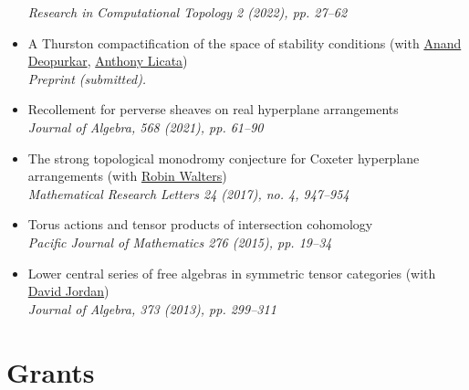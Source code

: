 \documentclass[a4paper]{moderncv}
\begin{document}
\begin{itemize}
\emph{Research in Computational Topology 2 (2022), pp. 27--62}
\item A Thurston compactification of the space of stability conditions (with \href{https://deopurkar.github.io}{Anand Deopurkar}, \href{https://maths-people.anu.edu.au/\~licatat/Home.html}{Anthony Licata})\\
\emph{Preprint (submitted).}
\item Recollement for perverse sheaves on real hyperplane arrangements\\
\emph{Journal of Algebra, 568 (2021), pp. 61--90}
\item The strong topological monodromy conjecture for Coxeter hyperplane arrangements (with \href{http://www.robinwalters.com/}{Robin Walters})\\
\emph{Mathematical Research Letters 24 (2017), no. 4, 947--954}
\item Torus actions and tensor products of intersection cohomology\\
\emph{Pacific Journal of Mathematics 276 (2015), pp. 19--34}
\item Lower central series of free algebras in symmetric tensor categories (with \href{http://www.maths.ed.ac.uk/\~djordan/}{David Jordan})\\
\emph{Journal of Algebra, 373 (2013), pp. 299--311}
\end{itemize}

\section*{Grants}
\label{sec:orgacb0b62}
\end{document}
